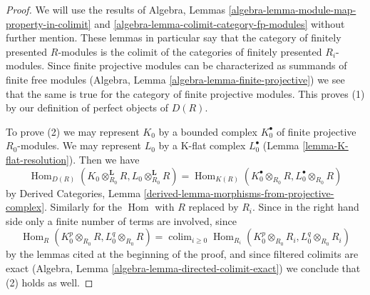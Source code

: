 \documentclass[10pt,a4paper]{amsart}
\theoremstyle{plain}
\theoremstyle{definition}
\theoremstyle{remark}
\numberwithin{equation}{subsection}
\def\colim{\mathop{\mathrm{colim}}\nolimits}
\def\Hom{\mathop{\mathrm{Hom}}\nolimits}
\begin{document}
\begin{proof}
We will use the results of
Algebra, Lemmas \ref{algebra-lemma-module-map-property-in-colimit} and
\ref{algebra-lemma-colimit-category-fp-modules}
without further mention. These lemmas in particular say that the
category of finitely presented $R$-modules is the colimit of the
categories of finitely presented $R_i$-modules. Since finite projective
modules can be characterized as summands of finite free modules
(Algebra, Lemma \ref{algebra-lemma-finite-projective}) we see that
the same is true for the category of finite projective modules.
This proves (1) by our definition of perfect objects of $D(R)$.

\medskip\noindent
To prove (2) we may represent $K_0$ by a bounded complex $K_0^\bullet$ of
finite projective $R_0$-modules. We may represent $L_0$ by a K-flat
complex $L_0^\bullet$ (Lemma \ref{lemma-K-flat-resolution}).
Then we have
$$
\Hom_{D(R)}(K_0 \otimes_{R_0}^\mathbf{L} R, L_0 \otimes_{R_0}^\mathbf{L} R) =
\Hom_{K(R)}(K_0^\bullet \otimes_{R_0} R, L_0^\bullet \otimes_{R_0} R)
$$
by Derived Categories, Lemma
\ref{derived-lemma-morphisms-from-projective-complex}.
Similarly for the $\Hom$ with $R$ replaced by $R_i$. Since
in the right hand side only a finite number of terms are involved,
since
$$
\Hom_R(K_0^p \otimes_{R_0} R, L_0^q \otimes_{R_0} R) =
\colim_{i \geq 0}
\Hom_{R_i}(K_0^p \otimes_{R_0} R_i, L_0^q \otimes_{R_0} R_i)
$$
by the lemmas cited at the beginning of the proof, and since
filtered colimits are exact
(Algebra, Lemma \ref{algebra-lemma-directed-colimit-exact})
we conclude that (2) holds as well.
\end{proof}
\end{document}

